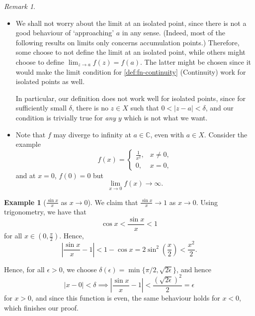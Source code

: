 \documentclass[11pt]{article}
\numberwithin{equation}{section}
\theoremstyle{definition}
\newtheorem{example}[theorem]{Example}
\theoremstyle{remark}
\newtheorem{remark}[theorem]{Remark}
\newcommand{\pqty}[1]{\left(#1\right)}
\newcommand{\abs}[1]{\left|#1\right|}
\newcommand{\oointv}[2]{(#1,#2)}
\newcommand{\CC}{\mathbb C}
\begin{document}
\begin{remark}\label{analysis-unit-0073}
    \begin{itemize}
        \item We shall not worry about the limit at an isolated point, since there is not a good behaviour of `approaching' \(a\) in any sense. (Indeed, most of the following results on limits only concerns accumulation points.) Therefore, some choose to not define the limit at an isolated point, while others might choose to define \(\lim_{z \to a} f\pqty{z} = f\pqty{a}\). The latter might be chosen since it would make the limit condition for \autoref{def:fn-continuity} (Continuity) work for isolated points as well.
        
        In particular, our definition does not work well for isolated points, since for sufficiently small \(\delta\), there is no \(z \in X\) such that \(0 < \abs{z - a} < \delta\), and our condition is trivially true for \emph{any} \(y\) which is not what we want.

        \item Note that \(f\) may diverge to infinity at \(a \in \CC\), even with \(a \in X\). Consider the example
        \[
            f\pqty{x} = \begin{cases}
                \frac{1}{x^2}, & x \neq 0, \\
                0, & x = 0,
            \end{cases}  
        \]
        and at \(x = 0\), \(f\pqty{0} = 0\) but
        \[
            \lim_{x \to 0} f\pqty{x} \to \infty.
        \]
    \end{itemize}
\end{remark}

\begin{example}[\(\frac{\sin x}{x}\) as \(x \to 0\)]\label{analysis-unit-0074}
    \label{ex:sin-x-x-limit}%
    We claim that \(\frac{\sin x}{x} \to 1\) as \(x \to 0\). Using trigonometry, we have that
    \[
        \cos x < \frac{\sin x}{x} < 1
    \]
    for all \(x \in \oointv{0}{\frac{\pi}{2}}\). Hence,
    \[
        \abs{\frac{\sin x}{x} - 1} < 1 - \cos x = 2 \sin^2 \pqty{\frac{x}{2}} < \frac{x^2}{2}.
    \]

    Hence, for all \(\epsilon > 0\), we choose \(\delta(\epsilon)=\min\{\pi/2,\sqrt{2\epsilon}\}\), and hence
    \[
        \abs{x - 0} < \delta \implies \abs{\frac{\sin x}{x} - 1} < \frac{\pqty{\sqrt{2 \epsilon}}^2}{2} = \epsilon
    \]
    for \(x > 0\), and since this function is even, the same behaviour holds for \(x < 0\), which finishes our proof.
\end{example}
\end{document}
